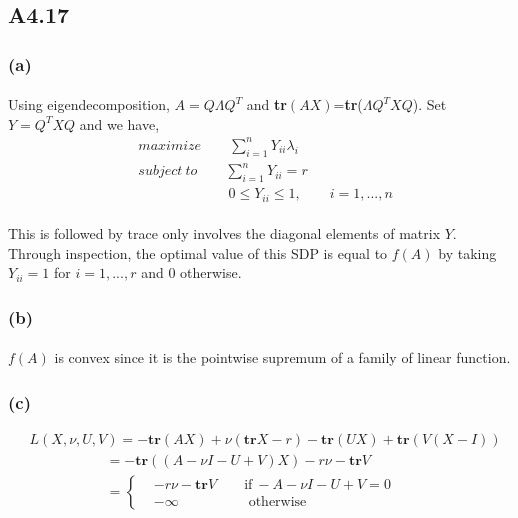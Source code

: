 \subsection*{A4.17}
\subsubsection*{(a)}
\paragraph{}
Using eigendecomposition, $A = Q\Lambda Q^T$ and \textbf{tr}$(AX) $=\textbf{tr}($\Lambda Q^TXQ$). Set $Y = Q^TXQ$ and we have,
\begin{align*}
&maximize \qquad \sum_{i=1}^{n}Y_{ii}\lambda_i\\
&subject\ to \qquad \sum_{i=1}^{n}Y_{ii} = r\\
&\qquad \qquad \qquad \ \ 0 \leq Y_{ii} \leq 1, \qquad i=1,...,n
\end{align*} 
\paragraph{}
This is followed by trace only involves the diagonal elements of matrix $Y$. Through inspection, the optimal value of this SDP is equal to $f(A)$ by taking $Y_{ii} = 1$ for $i=1,...,r$ and 0 otherwise.
\subsubsection*{(b)}
\paragraph{}
$f(A)$ is convex since it is the pointwise supremum of a family of linear function.
\subsubsection*{(c)}
\begin{align*}
&L(X, \nu, U, V) = -\textbf{tr}(AX) +\nu(\textbf{tr}X-r) - \textbf{tr}(UX) + \textbf{tr}(V(X-I))\\
&\qquad \qquad \quad \ \ 	= -\textbf{tr}((A-\nu I -U +V)X)-r\nu-\textbf{tr}V\\
&\qquad \qquad \quad \ \ =\begin{cases}
& -r\nu-\textbf{tr}V \qquad \text{if} \ -A-\nu I -U +V = 0\\
& -\infty \qquad \qquad \quad  \text{otherwise}
\end{cases}
\end{align*}
